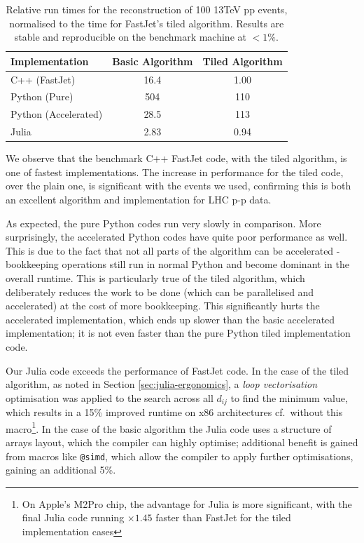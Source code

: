 \documentclass{webofc}
\begin{document}
\begin{table}[h]
  \begin{center}
    \begin{tabular}{l|cc}
      \textbf{Implementation} & \textbf{Basic Algorithm} & \textbf{Tiled Algorithm} \\
      \hline
      C++ (FastJet) & 16.4 & 1.00 \\
      Python (Pure) & 504 & 110 \\
      Python (Accelerated) & 28.5 & 113 \\
      Julia & 2.83 & 0.94 \\
    \end{tabular}
    \caption{Relative run times for the reconstruction of 100 13TeV pp events, 
    normalised to the time for FastJet's tiled algorithm. Results are stable and 
    reproducible on the benchmark machine at $<1\%$.}
    \label{tab:results}
  \end{center}
\end{table}

We observe that the benchmark C++ FastJet code, with the tiled algorithm, is one
of fastest implementations. The increase in performance for the tiled
code, over the plain one, is significant with the events we used,
confirming this is both an excellent algorithm and implementation for LHC p-p
data.

As expected, the pure Python codes run very slowly in comparison. More
surprisingly, the accelerated Python codes have quite poor performance as well.
This is due to the fact that not all parts of the algorithm can be accelerated -
bookkeeping operations still run in normal Python and become dominant in the
overall runtime. This is particularly true of the tiled algorithm, which
deliberately reduces the work to be done (which can be parallelised and
accelerated) at the cost of more bookkeeping. This significantly hurts the
accelerated implementation, which ends up slower than the basic accelerated
implementation; it is not even faster than the pure Python tiled implementation
code.

Our Julia code exceeds the performance of FastJet code. In the case of the tiled
algorithm, as noted in Section \ref{sec:julia-ergonomics}, a \emph{loop
vectorisation} optimisation was applied to the search across all $d_{ij}$ to
find the minimum value, which results in a 15\% improved runtime on x86
architectures cf.\ without this macro\footnote{On Apple's M2Pro chip, the
advantage for Julia is more significant, with the final Julia code running
$\times1.45$ faster than FastJet for the tiled implementation cases}. In the case of the basic
algorithm the Julia code uses a structure of arrays layout, which the compiler
can highly optimise; additional benefit is gained from macros like
\texttt{@simd}, which allow the compiler to apply further optimisations, gaining
an additional 5\%.
\end{document}
